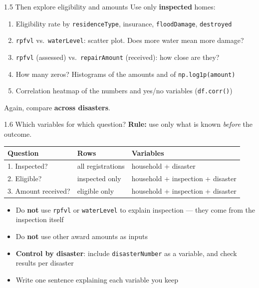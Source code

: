 \documentclass[aspectratio=43,11pt]{beamer}
\begin{document}
\begin{frame}{1.5 Then explore eligibility and amounts}
  Use only \textbf{inspected} homes:
  \vspace{0.5em}
  \begin{enumerate}
    \item Eligibility rate by \texttt{residenceType}, insurance,
          \texttt{floodDamage}, \texttt{destroyed}
    \item \texttt{rpfvl} vs.\ \texttt{waterLevel}: scatter plot.
          Does more water mean more damage?
    \item \texttt{rpfvl} (assessed) vs.\ \texttt{repairAmount} (received):
          how close are they?
    \item How many zeros? Histograms of the amounts and of
          \texttt{np.log1p(amount)}
    \item Correlation heatmap of the numbers and yes/no variables
          (\texttt{df.corr()})
  \end{enumerate}
  \vspace{0.5em}
  Again, compare \textbf{across disasters}.
\end{frame}

\begin{frame}{1.6 Which variables for which question?}
  \textbf{Rule:} use only what is known \emph{before} the outcome.
  \vspace{0.6em}
  \begin{center}
  \footnotesize
  \begin{tabular}{@{}lll@{}}
    \toprule
    Question & Rows & Variables \\
    \midrule
    1. Inspected? & all registrations & household + disaster \\
    2. Eligible? & inspected only & household + inspection + disaster \\
    3. Amount received? & eligible only & household + inspection + disaster \\
    \bottomrule
  \end{tabular}
  \end{center}
  \vspace{0.6em}
  \begin{itemize}
    \item Do \textbf{not} use \texttt{rpfvl} or \texttt{waterLevel} to explain inspection
          --- they come from the inspection itself
    \item Do \textbf{not} use other award amounts as inputs
    \item \textbf{Control by disaster}: include \texttt{disasterNumber}
          as a variable, and check results per disaster
    \item Write one sentence explaining each variable you keep
  \end{itemize}
\end{frame}
\end{document}
